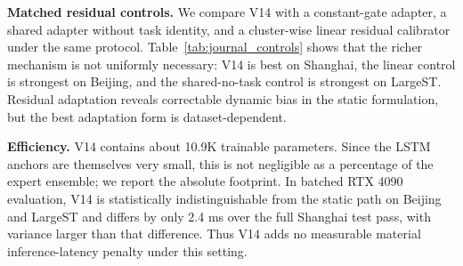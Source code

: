 \documentclass[lettersize,journal]{IEEEtran}
\begin{document}
\textbf{Matched residual controls.} We compare V14 with a constant-gate adapter, a shared adapter without task identity, and a cluster-wise linear residual calibrator under the same protocol. Table~\ref{tab:journal_controls} shows that the richer mechanism is not uniformly necessary: V14 is best on Shanghai, the linear control is strongest on Beijing, and the shared-no-task control is strongest on LargeST. Residual adaptation reveals correctable dynamic bias in the static formulation, but the best adaptation form is dataset-dependent.

\begin{table}[!t]
\centering
\caption{Matched-control analysis (five seeds). Each entry reports MAE / MSE; lower is better.}
\label{tab:journal_controls}
\end{table}

\textbf{Efficiency.} V14 contains about 10.9K trainable parameters. Since the LSTM anchors are themselves very small, this is not negligible as a percentage of the expert ensemble; we report the absolute footprint. In batched RTX 4090 evaluation, V14 is statistically indistinguishable from the static path on Beijing and LargeST and differs by only 2.4 ms over the full Shanghai test pass, with variance larger than that difference. Thus V14 adds no measurable material inference-latency penalty under this setting.

\begin{table}[!t]
\centering
\caption{Additional parameter footprint and batched inference cost of V14.}
\label{tab:journal_cost}
\end{table}
\end{document}
